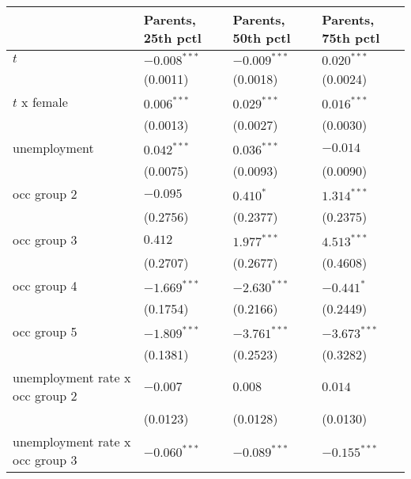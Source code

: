 \begin{tabular}{llll}
\toprule
{} & Parents, 25th pctl & Parents, 50th pctl & Parents, 75th pctl \\
\midrule
$t$                                      &     $-0.008^{***}$ &     $-0.009^{***}$ &      $0.020^{***}$ \\
                                         &           (0.0011) &           (0.0018) &           (0.0024) \\
$t$ x female                             &      $0.006^{***}$ &      $0.029^{***}$ &      $0.016^{***}$ \\
                                         &           (0.0013) &           (0.0027) &           (0.0030) \\
unemployment                             &      $0.042^{***}$ &      $0.036^{***}$ &           $-0.014$ \\
                                         &           (0.0075) &           (0.0093) &           (0.0090) \\
occ group 2                              &           $-0.095$ &          $0.410^*$ &      $1.314^{***}$ \\
                                         &           (0.2756) &           (0.2377) &           (0.2375) \\
occ group 3                              &            $0.412$ &      $1.977^{***}$ &      $4.513^{***}$ \\
                                         &           (0.2707) &           (0.2677) &           (0.4608) \\
occ group 4                              &     $-1.669^{***}$ &     $-2.630^{***}$ &         $-0.441^*$ \\
                                         &           (0.1754) &           (0.2166) &           (0.2449) \\
occ group 5                              &     $-1.809^{***}$ &     $-3.761^{***}$ &     $-3.673^{***}$ \\
                                         &           (0.1381) &           (0.2523) &           (0.3282) \\
unemployment rate x occ group 2          &           $-0.007$ &            $0.008$ &            $0.014$ \\
                                         &           (0.0123) &           (0.0128) &           (0.0130) \\
unemployment rate x occ group 3          &     $-0.060^{***}$ &     $-0.089^{***}$ &     $-0.155^{***}$ \\

\end{tabular}
